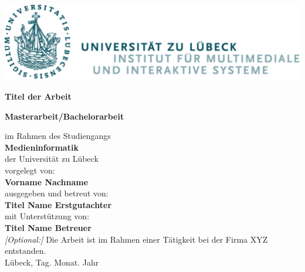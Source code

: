 \begin{titlepage}
    \begin{center}
        \includegraphics{figures/logo.png}\\
        \normalsize
        \sffamily
        
        \vspace{3cm} 
        
        \Huge
        \textbf{Titel der Arbeit}
        \vfill
        
        \normalsize
        \textbf{Masterarbeit/Bachelorarbeit} \\
        \vspace{0.4cm}
        
        im Rahmen des Studiengangs\\
        \textbf{Medieninformatik}\\
        der Universität zu Lübeck\\

        
        \vspace{0.8cm}
        vorgelegt von: \\
        \large
        \textbf{Vorname Nachname}\\ 
        
        \normalsize
        \vspace{0.8cm}
        ausgegeben und betreut von:\\ 
        \large
        \textbf{Titel Name Erstgutachter}\\
        \vspace{0.3cm}
        \normalsize
        mit Unterstützung von:\> \\ 
        \large
        \textbf{Titel Name Betreuer} \\
        \normalsize
        \vspace{0.5cm}
        \textit{[Optional:]}
        Die Arbeit ist im Rahmen einer Tätigkeit bei der Firma XYZ entstanden.\\
        \vspace{0.3cm}
        Lübeck, Tag. Monat. Jahr\\
    \end{center}
\end{titlepage}